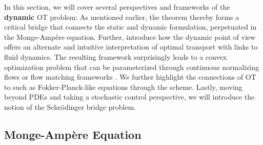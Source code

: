 In this section, we will cover several perspectives and frameworks of the \textbf{dynamic} \acrshort{OT} problem: As mentioned earlier, the \citeauthor{brenier1987decomposition} theorem thereby forms a critical bridge that connects the static and dynamic formulation, perpetuated in the Monge-Amp{\`e}re equation.
Further, \citet*{benamou2000computational} introduce how the dynamic point of view offers an alternate and intuitive interpretation of optimal transport with links to fluid dynamics. The resulting framework surprisingly leads to a convex optimization problem that can be parameterized through continuous normalizing flows \citep{tong2020trajectorynet, chen2018neural} or flow matching frameworks \citep{lipman2023flow, liu2022flow, pooladian2023multisample, albergo2023stochastic}.
We further highlight the connections of \acrshort{OT} to  such as Fokker-Planck-like equations through the \citeauthor*{jordan1998variational} scheme.
Lastly, moving beyond PDEs and taking a stochastic control perspective, we will introduce the notion of the Schr\"odinger bridge problem.


\subsection{Monge-Amp{\`e}re Equation} \label{sec:background_monge_ampere}


